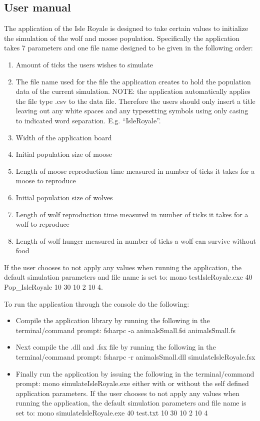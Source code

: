 \documentclass[a4paper]{report}
\begin{document}
\subsection*{User manual}
The application of the Isle Royale is designed to take certain values to initialize the simulation of the wolf and moose population. Specifically the application takes 7 parameters and one file name designed to be given in the following order:
\begin{enumerate}
\item Amount of ticks the users wishes to simulate
\item The file name used for the file the application creates to hold the population data of the current simulation. NOTE: the application automatically applies the file type .csv to the data file. Therefore the users should only insert a title leaving out any white spaces and any typesetting symbols using only casing to indicated word separation. E.g. “IsleRoyale”.
\item Width of the application board
\item Initial population size of moose
\item Length of moose reproduction time measured in number of ticks it takes for a moose to reproduce
\item Initial population size of wolves
\item Length of wolf reproduction time measured in number of ticks it takes for a wolf to reproduce
\item Length of wolf hunger measured in number of ticks a wolf can survive without food
\end{enumerate}

If the user chooses to not apply any values when running the application, the default simulation parameters and file name is set to: mono testIsleRoyale.exe 40 Pop\_IsleRoyale 10 30 10 2 10 4.

To run the application through the console do the following:

\begin{itemize}
\item  Compile the application library by running the following in the terminal/command prompt: fsharpc -a animalsSmall.fsi animalsSmall.fs
\item Next compile the .dll and .fsx file by running the following in the terminal/command prompt: fsharpc -r animalsSmall.dll simulateIsleRoyale.fsx
\item Finally run the application by issuing the following in the terminal/command prompt: mono simulateIsleRoyale.exe either with or without the self defined application parameters. If the user chooses to not apply any values when running the application, the default simulation parameters and file name is set to: mono simulateIsleRoyale.exe 40 test.txt 10 30 10 2 10 4
\end{itemize}
\end{document}
